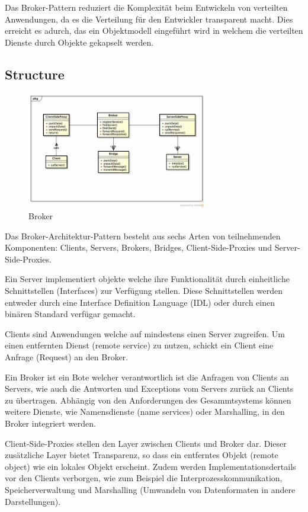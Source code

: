 Das Broker-Pattern reduziert die Komplexität beim Entwickeln von verteilten Anwendungen, da es die Verteilung für den Entwickler transparent macht. Dies erreicht es adurch, das ein Objektmodell eingeführt wird in welchem die verteilten Dienste durch Objekte gekapselt werden.

\subsection*{Structure}


\begin{figure}[H]
	\centering
	\includegraphics[width=0.7\textwidth]{content/posa1/images/broker-classes.png}
	\caption{Broker}
\end{figure}


Das Broker-Architektur-Pattern besteht aus sechs Arten von teilnehmenden Komponenten: Clients, Servers, Brokers, Bridges, Client-Side-Proxies und Server-Side-Proxies.

Ein Server implementiert objekte welche ihre Funktionalität durch einheitliche Schnittstellen (Interfaces) zur Verfügung stellen. Diese Schnittstellen werden entweder durch eine Interface Definition Language (IDL) oder durch einen binären Standard verfügar gemacht.

Clients sind Anwendungen welche auf mindestens einen Server zugreifen. Um einen entfernten Dienst (remote service) zu nutzen, schickt ein Client eine Anfrage (Request) an den Broker.

Ein Broker ist ein Bote welcher verantwortlich ist die Anfragen von Clients an Servers, wie auch die Antworten und Exceptions vom Servers zurück an Clients zu übertragen. Abhängig von den Anforderungen des Gesammtsystems können weitere Dienste, wie Namensdienste (name services) oder Marshalling, in den Broker integriert werden.

Client-Side-Proxies stellen den Layer zwischen Clients und Broker dar. Dieser zusätzliche Layer bietet Transparenz, so dass ein entferntes Objekt (remote object) wie ein lokales Objekt erscheint. Zudem werden Implementationsdertails vor den Clients verborgen, wie zum Beispiel die Interprozesskommunikation, Speicherverwaltung und Marshalling (Umwandeln von Datenformaten in andere Darstellungen).

